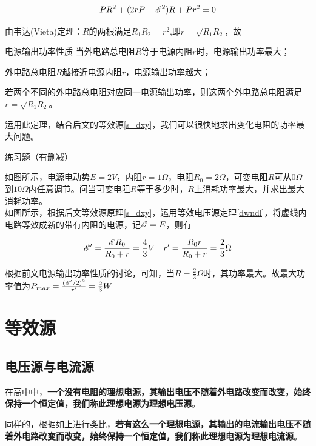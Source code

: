 $$P R^2 + (2 r P - \mathscr{E}^2)R + P r^2 = 0$$

由韦达(Vieta)定理：$R$的两根满足$R_1 R_2 = r^2$,即$r = \sqrt{R_1 R_2}$，故

\begin{theo}{电源输出功率性质}{}
当外电路总电阻$R$等于电源内阻$r$时，电源输出功率最大；

外电路总电阻$R$越接近电源内阻$r$，电源输出功率越大；

若两个不同的外电路总电阻对应同一电源输出功率，则这两个外电路总电阻满足$r = \sqrt{R_1 R_2}$。
\end{theo}

运用此定理，结合后文的等效源\eqref{s_dxy}，我们可以很快地求出变化电阻的功率最大问题。

\begin{ep}{练习题（有删减）}{}

如图所示，电源电动势$E=2V$，内阻$r=1\Omega$，电阻$R_0=2\Omega$，可变电阻$R$可从$0\Omega$到$10\Omega$内任意调节。问当可变电阻$R$等于多少时，$R$上消耗功率最大，并求出最大消耗功率。
~\\


如图所示，根据后文等效源原理\eqref{s_dxy}，运用等效电压源定理\eqref{dwndl}，将虚线内电路等效成新的带有内阻的电源，记$\mathscr{E} = E$，则有

$$\mathscr{E}^{\prime} = \frac{\mathscr{E} R_0}{R_0 + r} = \frac{4}{3} V \quad r^{\prime} = \frac{R_0 r}{R_0 + r} = \frac{2}{3} \Omega$$

根据前文电源输出功率性质的讨论，可知，当$R=\frac{2}{3} \Omega$时，其功率最大。故最大功率值为$P_{max} = \frac{(\mathscr{E}^{\prime} / 2)^2}{r^{\prime}} = \frac{2}{3} W$

\end{ep}

\section{等效源}
\label{s_dxy}

\subsection{电压源与电流源}

在高中中，\textbf{一个没有电阻的理想电源，其输出电压不随着外电路改变而改变，始终保持一个恒定值，我们称此理想电源为理想电压源}。

同样的，根据如上进行类比，\textbf{若有这么一个理想电源，其输出的电流输出电压不随着外电路改变而改变，始终保持一个恒定值，我们称此理想电源为理想电流源}。


